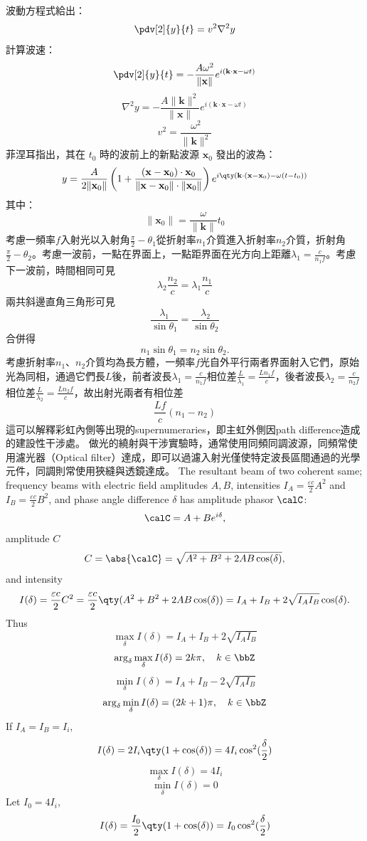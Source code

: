 \documentclass[a4paper,12pt]{report}
\begin{document}
波動方程式給出：
\[ \pdv[2]{y}{t} = v^2\nabla^2y \]
計算波速：
\[\pdv[2]{y}{t} = -\frac{A \omega^2}{\|\mathbf{x}\|} e^{i (\mathbf{k} \cdot \mathbf{x} - \omega t)}\]
\[\nabla^2 y = -\frac{A \|\mathbf{k}\|^2}{\|\mathbf{x}\|} e^{i (\mathbf{k} \cdot \mathbf{x} - \omega t)}\]
\[v^2 = \frac{\omega^2}{\|\mathbf{k}\|^2}\]
菲涅耳指出，其在 $t_0$ 時的波前上的新點波源 $\mathbf{x}_0$ 發出的波為：
\[y=\frac{A}{2\|\mathbf{x}_0\|}\left(1+\frac{\left(\mathbf{x}-\mathbf{x}_0\right)\cdot\mathbf{x}_0}{\|\mathbf{x}-\mathbf{x}_0\|\cdot\|\mathbf{x}_0\|}\right)e^{i\qty(\mathbf{k}\cdot\left(\mathbf{x}-\mathbf{x}_0\right)-\omega \left(t-t_0\right))}\]
其中：
\[\|\mathbf{x}_0\|=\frac{\omega}{\|\mathbf{k}\|}t_0\]
考慮一頻率$f$入射光以入射角$\frac{\pi}{2}-\theta_1$從折射率$n_1$介質進入折射率$n_2$介質，折射角$\frac{\pi}{2}-\theta_2$。考慮一波前，一點在界面上，一點距界面在光方向上距離$\lambda_1=\frac{c}{n_1f}$。考慮下一波前，時間相同可見
\[\lambda_2\frac{n_2}{c}=\lambda_1\frac{n_1}{c}\]
兩共斜邊直角三角形可見
\[\frac{\lambda_1}{\sin\theta_1}=\frac{\lambda_2}{\sin\theta_2}\]
合併得
\[n_1\sin\theta_1=n_2\sin\theta_2.\]
考慮折射率$n_1$、$n_2$介質均為長方體，一頻率$f$光自外平行兩者界面射入它們，原始光為同相，通過它們長$L$後，前者波長$\lambda_1=\frac{c}{n_1f}$相位差$\frac{L}{\lambda_1}=\frac{Ln_1f}{c}$，後者波長$\lambda_2=\frac{c}{n_2f}$相位差$\frac{L}{\lambda_2}=\frac{Ln_2f}{c}$，故出射光兩者有相位差
\[\frac{Lf}{c}(n_1-n_2)\]
這可以解釋彩虹內側等出現的supernumeraries，即主虹外側因path difference造成的建設性干涉處。
做光的繞射與干涉實驗時，通常使用同頻同調波源，同頻常使用濾光器（Optical filter）達成，即可以過濾入射光僅使特定波長區間通過的光學元件，同調則常使用狹縫與透鏡達成。
The resultant beam of two coherent same; frequency beams with electric field amplitudes $A,B$, intensities $I_A=\frac{\varepsilon c}{2}A^2$ and $I_B=\frac{\varepsilon c}{2}B^2$, and phase angle difference $\delta$ has amplitude phasor $\calC$:
\[\calC=A+Be^{i\delta},\]
amplitude $C$
\[C=\abs{\calC}=\sqrt{A^2+B^2+2AB\cos(\delta)},\]
and intensity
\[I(\delta)=\frac{\varepsilon c}{2}C^2=\frac{\varepsilon c}{2}\qty(A^2+B^2+2AB\cos(\delta))=I_A+I_B+2\sqrt{I_AI_B}\cos(\delta).\]
Thus
\[\max_{\delta}I(\delta)=I_A+I_B+2\sqrt{I_AI_B}\]
\[\arg_{\delta}\max_{\delta}I(\delta)=2k\pi,\quad k\in\bbZ\]
\[\min_{\delta}I(\delta)=I_A+I_B-2\sqrt{I_AI_B}\]
\[\arg_{\delta}\min_{\delta}I(\delta)=(2k+1)\pi,\quad k\in\bbZ\]
If $I_A=I_B=I_i$,
\[I(\delta)=2I_i\qty(1+\cos(\delta))=4I_i\cos^2(\frac{\delta}{2})\]
\[\max_{\delta}I(\delta)=4I_i\]
\[\min_{\delta}I(\delta)=0\]
Let $I_0=4I_i$,
\[I(\delta)=\frac{I_0}{2}\qty(1+\cos(\delta))=I_0\cos^2(\frac{\delta}{2})\]
\end{document}
